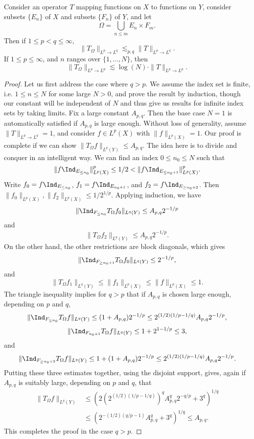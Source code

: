 \begin{theorem}
    Consider an operator $T$ mapping functions on $X$ to functions on $Y$, consider subsets $\{ E_n \}$ of $X$ and subsets $\{ F_n \}$ of $Y$, and let
    \[ \Omega = \bigcup_{n \leq m} E_n \times F_m. \]
    Then if $1 \leq p < q \leq \infty$,
    \[ \| T_\Omega \|_{L^p \to L^q} \lesssim_{p,q} \| T \|_{L^p \to L^q}. \]
    If $1 \leq p \leq \infty$, and $n$ ranges over $\{ 1, \dots, N \}$, then
    \[ \| T_\Omega \|_{L^p \to L^p} \lesssim \log(N) \cdot \| T \|_{L^p \to L^p}. \]
\end{theorem}
\begin{proof}
    Let us first address the case where $q > p$. We assume the index set is finite, i.e. $1 \leq n \leq N$ for some large $N > 0$, and prove the result by induction, though our constant will be independent of $N$ and thus give us results for infinite index sets by taking limits. Fix a large constant $A_{p,q}$. Then the base case $N = 1$ is automatically satisfied if $A_{p,q}$ is large enough. Without loss of generality, assume $\| T \|_{L^p \to L^q} = 1$, and consider $f \in L^p(X)$ with $\| f \|_{L^p(X)} = 1$. Our proof is complete if we can show $\| T_\Omega f \|_{L^q(Y)} \leq A_{p,q}$. The idea here is to divide and conquer in an intelligent way. We can find an index $0 \leq n_0 \leq N$ such that
    \[ \| f \Ind_{E_{\leq n_0}} \|_{L^p(X)}^p \leq 1/2 < \| f \Ind_{E_{\leq n_0 + 1}} \|_{L^p(X)}^p. \]
    Write $f_0 = f \Ind_{E_{\leq n_0}}$, $f_1 = f \Ind_{E_{n_0 + 1}}$, and $f_2 = f \Ind_{E_{\geq n_0 + 2}}$. Then $\| f_0 \|_{L^p(X)}, \| f_2 \|_{L^p(X)} \leq 1/2^{1/p}$. Applying induction, we have
    \[ \| \Ind_{F_{\leq n_0}} T_\Omega f_0 \|_{L^q(Y)} \leq A_{p,q} 2^{-1/p} \]
    and
    \[ \| T_\Omega f_2 \|_{L^q(Y)} \leq A_{p,q} 2^{-1/p}. \]
    On the other hand, the other restrictions are block diagonals, which gives
    \[ \| \Ind_{F_{\geq n_0 + 1}} T_\Omega f_0 \|_{L^q(Y)} \leq 2^{-1/p}, \]
    and
    \[ \| T_\Omega f_1 \|_{L^q(Y)} \leq \| f_1 \|_{L^p(X)} \leq \| f \|_{L^p(X)} \leq 1. \]
    The triangle inequality implies for $q > p$ that if $A_{p,q}$ is chosen large enough, depending on $p$ and $q$,
    \[ \| \Ind_{F_{\leq n_0}} T_\Omega f \|_{L^q(Y)} \leq (1 + A_{p,q}) 2^{-1/p} \leq 2^{(1/2)(1/p - 1/q)} A_{p,q} 2^{-1/p}, \]
    \[ \| \Ind_{F_{n_0 + 1}} T_\Omega f \|_{L^q(Y)} \leq 1 + 2^{1-1/p} \leq 3, \]
    and
    \[ \| \Ind_{F_{\geq n_0 + 2}} T_\Omega f \|_{L^q(Y)} \leq 1 + (1 + A_{p,q}) 2^{-1/p} \leq 2^{(1/2)(1/p - 1/q)} A_{p,q} 2^{-1/p}. \]
    Putting these three estimates together, using the disjoint support, gives, again if $A_{p,q}$ is suitably large, depending on $p$ and $q$, that
    \begin{align*}
        \| T_\Omega f \|_{L^q(Y)} &\leq ( 2 (2^{(1/2)(1/p - 1/q)})^q A_{p,q}^q 2^{-q/p} + 3^q )^{1/q}\\
        &\leq ( 2^{-(1/2)(q/p - 1)} A_{p,q}^q + 3^q )^{1/q} \leq A_{p,q}.
    \end{align*}
    This completes the proof in the case $q > p$.


\end{proof}
